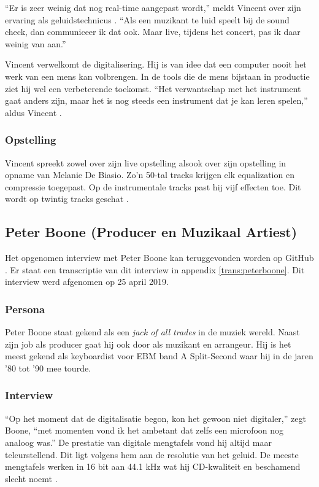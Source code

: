 ``Er is zeer weinig dat nog real-time aangepast wordt,'' meldt Vincent over zijn ervaring als geluidstechnicus \autocite{bartvincent}. ``Als een muzikant te luid speelt bij de sound check, dan communiceer ik dat ook. Maar live, tijdens het concert, pas ik daar weinig van aan.''

Vincent verwelkomt de digitalisering. Hij is van idee dat een computer nooit het werk van een mens kan volbrengen. In de tools die de mens bijstaan in productie ziet hij wel een verbeterende toekomst. ``Het verwantschap met het instrument gaat anders zijn, maar het is nog steeds een instrument dat je kan leren spelen,'' aldus Vincent \autocite{bartvincent}.

\subsubsection*{Opstelling}

Vincent spreekt zowel over zijn live opstelling alsook over zijn opstelling in opname van Melanie De Biasio. Zo'n 50-tal tracks krijgen elk equalization en compressie toegepast. Op de instrumentale tracks past hij vijf effecten toe. Dit wordt op twintig tracks geschat \autocite{bartvincent}.

\subsection{Peter Boone (Producer en Muzikaal Artiest)}
\label{sub:boone}

Het opgenomen interview met Peter Boone kan teruggevonden worden op GitHub \autocite{peterboone}. Er staat een transcriptie van dit interview in appendix \ref{trans:peterboone}. Dit interview werd afgenomen op 25 april 2019.

\subsubsection*{Persona}

Peter Boone staat gekend als een \textit{jack of all trades} in de muziek wereld. Naast zijn job als producer gaat hij ook door als muzikant en arrangeur. Hij is het meest gekend als keyboardist voor EBM band A Split-Second waar hij in de jaren '80 tot '90 mee tourde.

\subsubsection*{Interview}

``Op het moment dat de digitalisatie begon, kon het gewoon niet digitaler,'' zegt Boone, ``met momenten vond ik het ambetant dat zelfs een microfoon nog analoog was.'' \autocite{peterboone} De prestatie van digitale mengtafels vond hij altijd maar teleurstellend. Dit ligt volgens hem aan de resolutie van het geluid. De meeste mengtafels werken in 16 bit aan 44.1 kHz wat hij CD-kwaliteit en beschamend slecht noemt \autocite{peterboone}.

